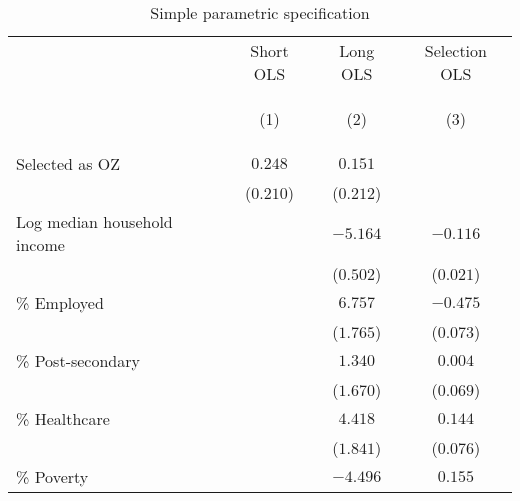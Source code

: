 
        \begin{table}[tbh]
        \caption{Simple parametric specification}
        \label{tab:simple}
        \footnotesize
        \centering
        \vspace{1em}
        \begin{threeparttable}
        \begin{tabular}{lccc}
\toprule
{} &                         Short OLS &                          Long OLS &                     Selection OLS \\
{} & \hypertarget{tabcol:simple1}{(1)} & \hypertarget{tabcol:simple2}{(2)} & \hypertarget{tabcol:simple3}{(3)} \\
\midrule
Selected as OZ              &                           $0.248$ &                           $0.151$ &                                   \\
                            &                         ($0.210$) &                         ($0.212$) &                                   \\
Log median household income &                                   &                          $-5.164$ &                          $-0.116$ \\
                            &                                   &                         ($0.502$) &                         ($0.021$) \\
\% Employed                 &                                   &                           $6.757$ &                          $-0.475$ \\
                            &                                   &                         ($1.765$) &                         ($0.073$) \\
\% Post-secondary           &                                   &                           $1.340$ &                           $0.004$ \\
                            &                                   &                         ($1.670$) &                         ($0.069$) \\
\% Healthcare               &                                   &                           $4.418$ &                           $0.144$ \\
                            &                                   &                         ($1.841$) &                         ($0.076$) \\
\% Poverty                  &                                   &                          $-4.496$ &                           $0.155$ \\

\end{tabular}
\end{threeparttable}
\end{table}
